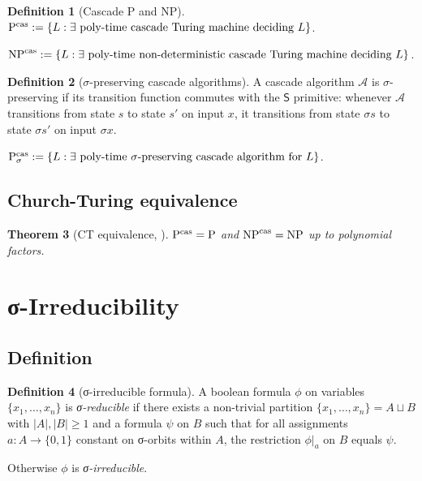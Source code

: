\documentclass[11pt, a4paper]{amsart}
\newtheorem{theorem}{Theorem}[section]
\theoremstyle{definition}
\newtheorem{definition}[theorem]{Definition}
\begin{document}
\begin{definition}[Cascade P and NP]\label{def:PNP}
$\mathrm{P}^{\rm cas} := \{L : \exists \text{ poly-time cascade Turing machine deciding } L\}$.

$\mathrm{NP}^{\rm cas} := \{L : \exists \text{ poly-time non-deterministic cascade Turing machine deciding } L\}$.
\end{definition}

\begin{definition}[$\sigma$-preserving cascade algorithms]\label{def:sigmaP}
A cascade algorithm $\mathcal{A}$ is $\sigma$-preserving if its transition
function commutes with the $\mathsf{S}$ primitive: whenever $\mathcal{A}$
transitions from state $s$ to state $s'$ on input $x$, it transitions
from state $\sigma s$ to state $\sigma s'$ on input $\sigma x$.

$\mathrm{P}_{\sigma}^{\rm cas} := \{L : \exists \text{ poly-time $\sigma$-preserving cascade algorithm for } L\}$.
\end{definition}

\subsection{Church-Turing equivalence}

\begin{theorem}[CT equivalence, \cite{CascadeDynamics}]\label{thm:CT}
$\mathrm{P}^{\rm cas} = \mathrm{P}$ and $\mathrm{NP}^{\rm cas} = \mathrm{NP}$ up
to polynomial factors.
\end{theorem}

\section{σ-Irreducibility}

\subsection{Definition}

\begin{definition}[σ-irreducible formula]\label{def:sigmairr}
A boolean formula $\phi$ on variables $\{x_1, \ldots, x_n\}$ is
\emph{σ-reducible} if there exists a non-trivial partition
$\{x_1, \ldots, x_n\} = A \sqcup B$ with $|A|, |B| \geq 1$ and a
formula $\psi$ on $B$ such that for all assignments $a: A \to \{0, 1\}$
constant on σ-orbits within $A$, the restriction $\phi|_{a}$ on $B$
equals $\psi$.

Otherwise $\phi$ is \emph{σ-irreducible}.
\end{definition}
\end{document}
